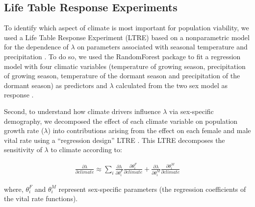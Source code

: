 \documentclass[9pt,twocolumn,twoside,lineno]{pnas-new}
\newcommand{\tom}[2]{{\color{red}{#1}}\footnote{\textit{\color{red}{#2}}}}
\newcommand{\jacob}[2]{{\color{blue}{#1}}\footnote{\textit{\color{blue}{#2}}}}
\begin{document}
\subsection*{Life Table Response Experiments}
To identify which aspect of climate is most important for population viability, we used a Life Table Response Experiment (LTRE) based on a nonparametric model for the dependence of $\lambda$ on parameters associated with seasonal temperature and precipitation \citep{ellner2016data}. 
To do so, we used the RandomForest package to fit a regression model with four climatic variables (temperature of growing season, precipitation of growing season, temperature of the dormant season and precipitation of the dormant season) as predictors  and $\lambda$  calculated from the two sex model as response \citep{liaw2002classification}.

Second, to understand how climate drivers influence $\lambda$ via sex-specific demography, we decomposed the effect of each climate variable on population growth rate ($\lambda$) into contributions arising from the effect on each female and male vital rate using a ``regression design'' LTRE \citep{caswell1989analysis}.
This LTRE decomposes the sensitivity of $\lambda$ to climate according to:

\begin{align}\label{eq:ltresex}
\frac{\partial \lambda}{\partial climate} \approx \sum_{i} \frac{\partial \lambda}{\partial \theta^{F}_{i}} \frac{\partial \theta^{F}_{i}}{\partial climate} + \frac{\partial \lambda}{\partial \theta^{M}_{i}} \frac{\partial \theta^{M}_{i}}{\partial climate}
\end{align}

\noindent where, $\theta^{F}_{i}$ and $\theta^{M}_{i}$ represent sex-specific parameters (the regression coefficients of the vital rate functions). 
\end{document}
